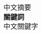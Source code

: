 \begin{abstractCH}

\setlength{\baselineskip}{1.5em}
中文摘要
\\

\noindent
\textbf{關鍵詞} \\
\noindent
中文關鍵字

\end{abstractCH}
